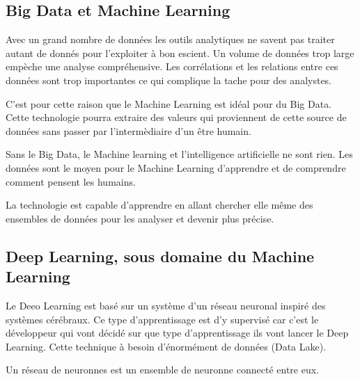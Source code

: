 \documentclass[10pt,a4paper]{article}
\begin{document}
\subsection{Big Data et Machine Learning}

Avec un grand nombre de données les outils analytiques ne savent pas traiter autant de donnés pour l'exploiter à bon escient. Un volume de données trop large empèche une analyse compréhensive. Les corrélations et les relations entre ces données sont trop importantes ce qui complique la tache pour des analystes. 

C'est pour cette raison que le Machine Learning est idéal pour du Big Data. Cette technologie pourra extraire des valeurs qui proviennent de cette source de données sans passer par l'intermèdiaire d'un être humain.

Sans le Big Data, le Machine learning et l'intelligence artificielle ne sont rien. Les données sont le moyen pour le Machine Learning d'apprendre et de comprendre comment pensent les humains. 

La technologie est capable d'apprendre en allant chercher elle même des ensembles de données pour les analyser et devenir plus précise.

\subsection{Deep Learning, sous domaine du Machine Learning}

Le Deeo Learning est basé sur un système d'un réseau neuronal inspiré des systèmes cérébraux. Ce type d'apprentissage est d'y supervisé car c'est le développeur qui vont décidé sur que type d'apprentissage ils vont lancer le Deep Learning. Cette technique à besoin d'énormément de données (Data Lake).

Un réseau de neuronnes est un ensemble de neuronne connecté entre eux. 

\label{Pour la partie sur le Machine Learning https://www.lebigdata.fr/machine-learning-et-big-data}


\label{https://www.youtube.com/watch?v=QR1SnCRungE&ab_channel=AlainOlivetti} 
\end{document}
